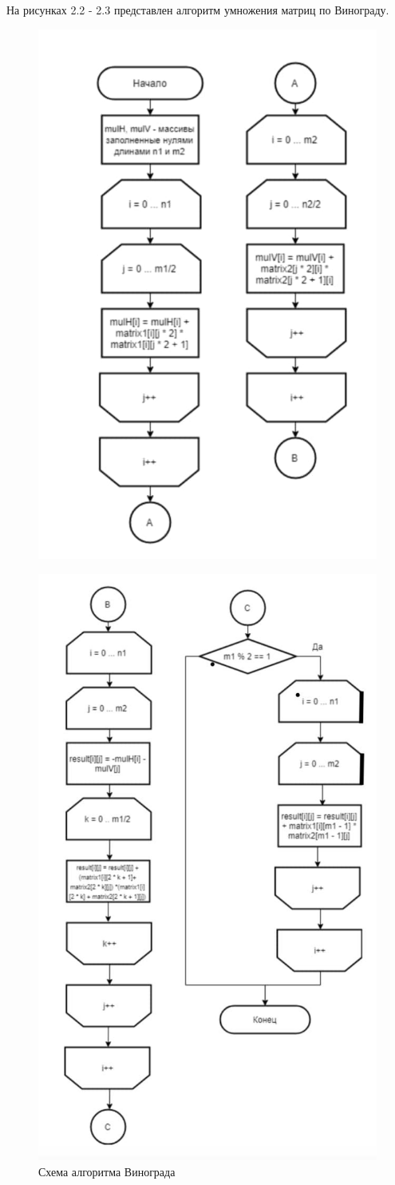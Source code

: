 \documentclass[12pt]{report}
\begin{document}
На рисунках 2.2 - 2.3 представлен алгоритм умножения матриц по Винограду.
\begin{figure}[H]
    \centering
    \includegraphics[width=0.70\linewidth]{2.jpg}
    \caption{}
    \label{fig:mpr}
\end{figure}

\begin{figure}[H]
    \centering
    \includegraphics[width=0.70\linewidth]{3.jpg}
    \caption{Схема алгоритма Винограда}
    \label{fig:mpr}
\end{figure}
\end{document}
